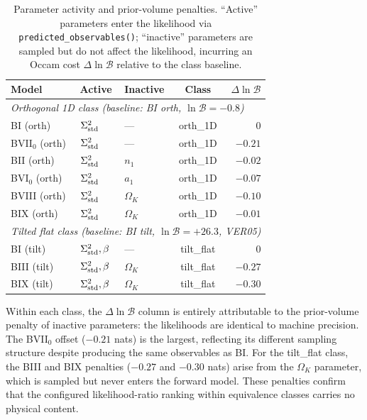 \begin{table}[t]
\caption{Parameter activity and prior-volume penalties.
  ``Active'' parameters enter the likelihood via
  \texttt{predicted\_observables()};
  ``inactive'' parameters are sampled but do not affect the
  likelihood, incurring an Occam cost $\Delta\ln\mathcal{B}$
  relative to the class baseline.}
\label{tab:identifiability}
\centering\footnotesize
\setlength{\tabcolsep}{3pt}
\begin{tabular}{lllcr}
\hline\hline
Model & Active & Inactive & Class &
  $\Delta\ln\mathcal{B}$ \\
\hline
\multicolumn{5}{l}{\emph{Orthogonal 1D class
  (baseline: BI orth, $\ln\mathcal{B} = -0.8$)}} \\[2pt]
BI (orth)     & $\Sigma^2_{\mathrm{std}}$ & --- & orth\_1D & $0$ \\
BVII$_0$ (orth) & $\Sigma^2_{\mathrm{std}}$ & --- & orth\_1D & $-0.21$ \\
BII (orth)    & $\Sigma^2_{\mathrm{std}}$ & $n_1$ & orth\_1D & $-0.02$ \\
BVI$_0$ (orth) & $\Sigma^2_{\mathrm{std}}$ & $a_1$ & orth\_1D & $-0.07$ \\
BVIII (orth)  & $\Sigma^2_{\mathrm{std}}$ & $\Omega_K$ & orth\_1D & $-0.10$ \\
BIX (orth)    & $\Sigma^2_{\mathrm{std}}$ & $\Omega_K$ & orth\_1D & $-0.01$ \\[4pt]
\multicolumn{5}{l}{\emph{Tilted flat class
  (baseline: BI tilt, $\ln\mathcal{B} = +26.3$, VER05)}} \\[2pt]
BI (tilt)  & $\Sigma^2_{\mathrm{std}}, \beta$ & --- & tilt\_flat & $0$ \\
BIII (tilt)& $\Sigma^2_{\mathrm{std}}, \beta$ & $\Omega_K$ & tilt\_flat & $-0.27$ \\
BIX (tilt) & $\Sigma^2_{\mathrm{std}}, \beta$ & $\Omega_K$ & tilt\_flat & $-0.30$ \\
\hline\hline
\end{tabular}
\end{table}

Within each class, the $\Delta\ln\mathcal{B}$ column is
entirely attributable to the prior-volume penalty of inactive
parameters: the likelihoods are identical to machine precision.
The BVII$_0$ offset ($-0.21$ nats) is the largest, reflecting
its different sampling structure despite producing the same
observables as BI.  For the tilt\_flat class, the BIII and BIX
penalties ($-0.27$ and $-0.30$ nats) arise from the
$\Omega_K$ parameter, which is sampled but never enters the
forward model.  These penalties confirm that the configured
likelihood-ratio ranking within equivalence classes carries no physical content.


